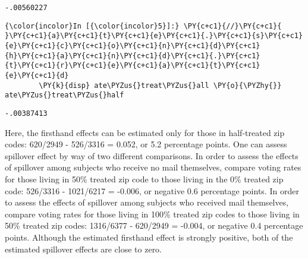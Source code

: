 \documentclass[11pt,notitlepage]{article}\usepackage[]{graphicx}\usepackage[]{color}
\makeatletter
\newenvironment{kframe}{%
 \def\at@end@of@kframe{}%
 \ifinner\ifhmode%
  \def\at@end@of@kframe{\end{minipage}}%
  \begin{minipage}{\columnwidth}%
 \fi\fi%
 \def\FrameCommand##1{\hskip\@totalleftmargin \hskip-\fboxsep
 \colorbox{shadecolor}{##1}\hskip-\fboxsep
     \hskip-\linewidth \hskip-\@totalleftmargin \hskip\columnwidth}%
 \MakeFramed {\advance\hsize-\width
   \@totalleftmargin\z@ \linewidth\hsize
   \@setminipage}}%
 {\par\unskip\endMakeFramed%
 \at@end@of@kframe}
\newenvironment{knitrout}{}{} %
\makeatother
\begin{document}
\begin{enumerate}[a)]
\begin{knitrout}
\begin{kframe}
    \begin{Verbatim}[commandchars=\\\{\}]
-.00560227

    \end{Verbatim}

    \begin{Verbatim}[commandchars=\\\{\}]
{\color{incolor}In [{\color{incolor}5}]:} \PY{c+c1}{//}\PY{c+c1}{ }\PY{c+c1}{a}\PY{c+c1}{t}\PY{c+c1}{e}\PY{c+c1}{.}\PY{c+c1}{s}\PY{c+c1}{e}\PY{c+c1}{c}\PY{c+c1}{o}\PY{c+c1}{n}\PY{c+c1}{d}\PY{c+c1}{h}\PY{c+c1}{a}\PY{c+c1}{n}\PY{c+c1}{d}\PY{c+c1}{.}\PY{c+c1}{t}\PY{c+c1}{r}\PY{c+c1}{e}\PY{c+c1}{a}\PY{c+c1}{t}\PY{c+c1}{e}\PY{c+c1}{d}
        \PY{k}{disp} ate\PYZus{}treat\PYZus{}all \PY{o}{\PYZhy{}} ate\PYZus{}treat\PYZus{}half
\end{Verbatim}

    \begin{Verbatim}[commandchars=\\\{\}]
-.00387413
    \end{Verbatim}
\end{kframe}
\end{knitrout}

Here, the firsthand effects can be estimated only for those in half-treated zip codes: 620/2949 - 526/3316 = 0.052, or 5.2 percentage points. One can assess spillover effect by way of two different comparisons. In order to assess the effects of spillover among subjects who receive no mail themselves, compare voting rates for those living in 50\% treated zip code to those living in the 0\% treated zip code: 526/3316 - 1021/6217 = -0.006, or negative 0.6 percentage points. In order to assess the effects of spillover among subjects who received mail themselves, compare voting rates for those living in 100\% treated zip codes to those living in 50\% treated zip codes:  1316/6377 - 620/2949 = -0.004, or negative 0.4 percentage points.  Although the estimated firsthand effect is strongly positive, both of the estimated spillover effects are close to zero.
\end{enumerate}
\end{document}
